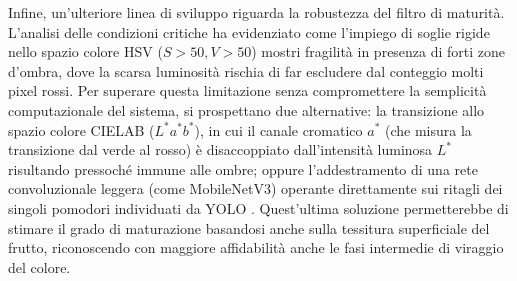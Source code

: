 Infine, un'ulteriore linea di sviluppo riguarda la robustezza del filtro di maturità. L'analisi 
delle condizioni critiche ha evidenziato come l'impiego di soglie rigide nello spazio colore HSV 
($S > 50, V > 50$) mostri fragilità in presenza di forti zone d'ombra, dove la scarsa luminosità 
rischia di far escludere dal conteggio molti pixel rossi. Per superare questa limitazione senza 
compromettere la semplicità computazionale del sistema, si prospettano due alternative: la transizione 
allo spazio colore CIELAB ($L^*a^*b^*$), in cui il canale cromatico $a^*$ (che misura la transizione dal 
verde al rosso) è disaccoppiato dall'intensità luminosa $L^*$ risultando pressoché immune alle ombre; 
oppure l'addestramento di una rete convoluzionale leggera (come MobileNetV3) operante direttamente 
sui ritagli dei singoli pomodori individuati da YOLO \cite{xiao2023fruit}. Quest'ultima soluzione 
permetterebbe di stimare il grado di maturazione basandosi anche sulla tessitura superficiale del frutto, 
riconoscendo con maggiore affidabilità anche le fasi intermedie di viraggio del colore.

